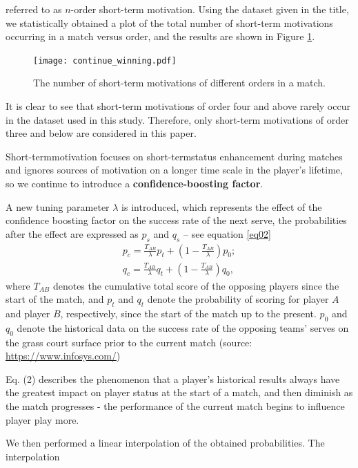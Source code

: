 \documentclass{mcmthesis}
\begin{document}
referred to as $n$-order short-term motivation. Using the dataset given in the title, we statistically
obtained a plot of the total number of short-term motivations occurring in a match versus order,
and the results are shown in Figure \ref{fig3}. \par
\begin{figure}[h]
  \centering
  \texttt{[image: continue\_winning.pdf]}
  \caption{The number of short-term motivations of different orders in a match.} \label{fig4}
  \label{fig3}
\end{figure}
It is clear to see that short-term motivations of order four
and above rarely occur in the dataset used in this study. Therefore, only short-term motivations
of order three and below are considered in this paper.\par
Short-termmotivation focuses on short-termstatus enhancement during matches and ignores
sources of motivation on a longer time scale in the player’s lifetime, so we continue to introduce
a \textbf{confidence-boosting factor}.\par
A new tuning parameter $\lambda$ is introduced, which represents the effect of the confidence
boosting factor on the success rate of the next serve, the probabilities after the effect are
expressed as $p_s$ and $q_s$ – see equation \eqref{eq02}
\begin{equation}
  \begin{split}
    p_c = \frac{T_{AB}}{\lambda} p_t + \left(1 - \frac{T_{AB}}{\lambda}\right) p_0;\\
  q_c = \frac{T_{AB}}{\lambda} q_t + \left(1 - \frac{T_{AB}}{\lambda}\right) q_0,
  \end{split}
  \label{eq02}
\end{equation}
where $T_{AB}$ denotes the cumulative total score of the opposing players since the start of the
match, and $p_t$ and $q_t$ denote the probability of scoring for player $A$ and player $B$, respectively,
since the start of the match up to the present. $p_0$ and $q_0$ denote the historical data on the success
rate of the opposing teams’ serves on the grass court surface prior to the current match (source:
\url{https://www.infosys.com/})\par
Eq. (2) describes the phenomenon that a player’s historical results always have the greatest
impact on player status at the start of a match, and then diminish as the match progresses - the
performance of the current match begins to influence player play more.\par
We then performed a linear interpolation of the obtained probabilities. The interpolation
\end{document}
